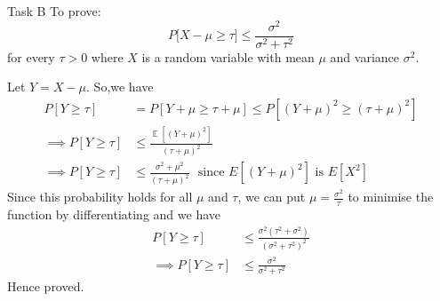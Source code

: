 \begin{task}{Task B}
	To prove:
	\begin{equation}
		P\big[X- \mu \geq \tau \big] \leq \frac{\sigma^2}{\sigma^2+\tau^2}
	\end{equation}
	for every $\tau >0$ where $X$ is a random variable with mean $\mu$ and variance $\sigma^2$. \\
	\par Let $Y=X-\mu$. So,we have
	\begin{align}
		P[Y\geq \tau]          & =P[Y+\mu \geq \tau+\mu] \leq P[(Y+\mu)^2\geq (\tau+\mu)^2]                              \\
		\implies P[Y\geq \tau] & \leq \frac{\mathop{\mathbb{E}}[(Y+\mu)^2]}{(\tau+\mu)^2}                                \\
		\implies P[Y\geq \tau] & \leq \frac{\sigma^2+\mu^2}{(\tau+\mu)^2} \:\:\: \text{since $E[(Y+\mu)^2]$ is $E[X^2]$}
	\end{align}
	Since this probability holds for all $\mu$ and $\tau$, we can put $\mu=\frac{\sigma^2}{\tau}$ to minimise the function by differentiating and we have
	\begin{align}
		P[Y\geq \tau]          & \leq \frac{\sigma^{2}(\tau^2+\sigma^2)}{(\sigma^2+\tau^2)^2} \\
		\implies P[Y\geq \tau] & \leq \frac{\sigma^{2}}{\sigma^2+\tau^2}
	\end{align}
	Hence proved.
\end{task}


